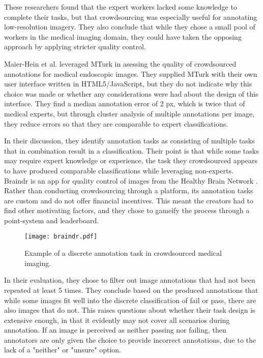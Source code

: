 \documentclass[../report.tex]{subfiles}
\begin{document}
These researchers found that the expert workers lacked some knowledge to complete their tasks, but that crowdsourcing was especially useful for annotating low-resolution imagery. They also conclude that while they chose a small pool of workers in the medical imaging domain, they could have taken the opposing approach by applying stricter quality control.

Maier-Hein et al. \cite{maier2014endoscopic} leveraged MTurk in asessing the quality of crowdsourced annotations for medical endoscopic images. They supplied MTurk with their own user interface written in HTML5/JavaScript, but they do not indicate why this choice was made or whether any considerations were had about the design of this interface.  They find a median annotation error of 2 px, which is twice that of medical experts, but through cluster analysis of multiple annotations per image, they reduce errors so that they are comparable to expert classifications.

In their discussion, they identify annotation tasks as consisting of multiple tasks that in combination result in a classification. Their point is that while some tasks may require expert knowledge or experience, the task they crowdsourced appears to have produced comparable classifications while leveraging non-experts.\\

Braindr \cite{Braindr} is an app for quality control of images from the Healthy Brain Network \cite{Alexander2017HealthyBrain}. Rather than conducting crowdsourcing through a platform, its annotation tasks are custom and do not offer financial incentives. This meant the creators had to find other motivating factors, and they chose to gameify the process through a point-system and leaderboard. \\

\begin{figure}[h]
\centering
\texttt{[image: braindr.pdf]}
\caption{Example of a discrete annotation task in crowdsourced medical imaging. \cite{Braindr}}
\label{figure:braindr}
\end{figure}

In their evaluation, they chose to filter out image annotations that had not been repeated at least 5 times. They conclude based on the produced annotations that while some images fit well into the discrete classification of fail or pass, there are also images that do not. This raises questions about whether their task design is extensive enough, in that it evidently may not cover all scenarios during annotation. If an image is perceived as neither passing nor failing, then annotators are only given the choice to provide incorrect annotations, due to the lack of a "neither" or "unsure" option. \\
\end{document}
